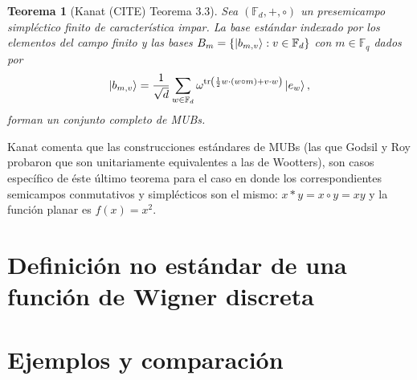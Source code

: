\documentclass[a4paper]{report}
\DeclareMathOperator{\tr}{tr}
\newtheorem{theorem}{Teorema}
\begin{document}
  \begin{theorem}[Kanat (CITE) Teorema 3.3]
    Sea $(\mathbb F_d, +, \circ)$ un presemicampo
    simpléctico finito de característica impar. La base
    estándar indexado por los elementos del campo finito y
    las bases $B_m = \{\ket{b_{m,v}} : v \in \mathbb F_d\}$ 
    con $m \in \mathbb F_q$ dados por
    \[
      \ket{b_{m,v}}
      = \frac{1}{\sqrt{d}} \sum_{w \in \mathbb F_d}^{}
      \omega^{\tr\left( \frac{1}{2} w \cdot (w \circ m) + v
      \cdot w\right) } \ket{e_w},
    \] 
    forman un conjunto completo de MUBs.
  \end{theorem}
  Kanat comenta que las construcciones estándares de MUBs
  (las que Godsil y Roy probaron que son unitariamente
  equivalentes a las de Wootters), son casos específico de
  éste último teorema para el caso en donde los
  correspondientes semicampos conmutativos y simplécticos
  son el mismo: $x * y = x \circ y = xy$ y la función planar
  es $f(x) = x^2$.

  \section{Definición no estándar de una función de Wigner
  discreta}

  \section{Ejemplos y comparación}

  \newpage
  \appendix

  \newpage
  \printbibliography
\end{document}
